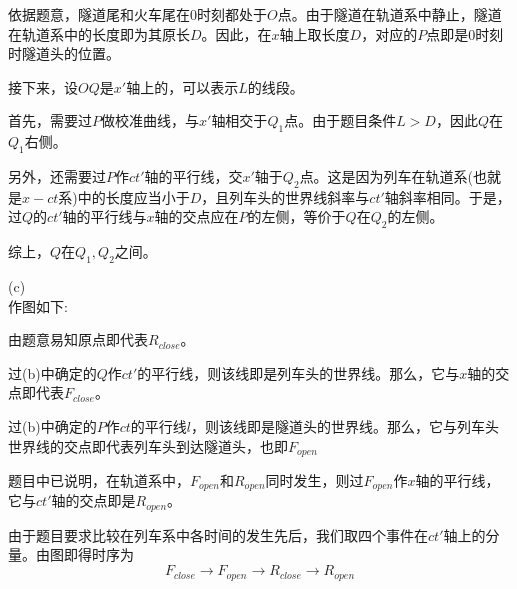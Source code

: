 \begin{solution}
    依据题意，隧道尾和火车尾在$0$时刻都处于$O$点。由于隧道在轨道系中静止，隧道在轨道系中的长度即为其原长$D$。因此，在$x$轴上取长度$D$，对应的$P$点即是$0$时刻时隧道头的位置。
    
    接下来，设$OQ$是$x'$轴上的，可以表示$L$的线段。
    
    首先，需要过$P$做校准曲线，与$x'$轴相交于$Q_1$点。由于题目条件$L>D$，因此$Q$在$Q_1$右侧。
    
    另外，还需要过$P$作$ct'$轴的平行线，交$x'$轴于$Q_2$点。这是因为列车在轨道系(也就是$x-ct$系)中的长度应当小于$D$，且列车头的世界线斜率与$ct'$轴斜率相同。于是，过$Q$的$ct'$轴的平行线与$x$轴的交点应在$P$的左侧，等价于$Q$在$Q_2$的左侧。
    
    综上，$Q$在$Q_1,Q_2$之间。
    
    (c)\\
    作图如下:
    \begin{center}
    \end{center}
    
    由题意易知原点即代表$R_{close}$。
    
    过(b)中确定的$Q$作$ct'$的平行线，则该线即是列车头的世界线。那么，它与$x$轴的交点即代表$F_{close}$。
    
    过(b)中确定的$P$作$ct$的平行线$l$，则该线即是隧道头的世界线。那么，它与列车头世界线的交点即代表列车头到达隧道头，也即$F_{open}$
    
    题目中已说明，在轨道系中，$F_{open}$和$R_{open}$同时发生，则过$F_{open}$作$x$轴的平行线，它与$ct'$轴的交点即是$R_{open}$。
    
    由于题目要求比较在列车系中各时间的发生先后，我们取四个事件在$ct'$轴上的分量。由图即得时序为
    \[F_{close}\rightarrow F_{open}\rightarrow R_{close}\rightarrow R_{open}\]
\end{solution}
\newpage
